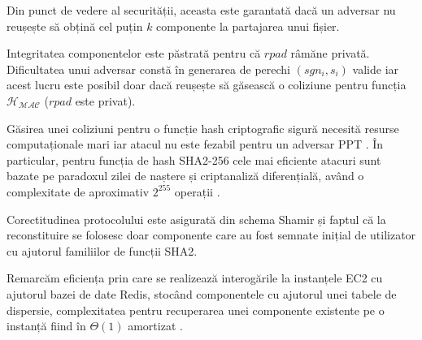 \documentclass[oneside, 12pt]{book}
\begin{document}
Din punct de vedere al securității, aceasta este garantată dacă un adversar nu reușește să obțină cel puțin $k$ componente la partajarea unui fișier.

Integritatea componentelor este păstrată pentru că $rpad$ râmăne privată. Dificultatea unui adversar constă în generarea de perechi $(sgn_i, s_i)$ valide iar acest lucru este posibil doar dacă reușește să găsească o coliziune pentru funcția $\mathcal{H_{MAC}}$ ($rpad$ este privat).

Găsirea unei coliziuni pentru o funcție hash criptografic sigură necesită resurse computaționale mari iar atacul nu este fezabil pentru un adversar PPT \cite{Katz:2007}. În particular, pentru funcția de hash SHA2-256 cele mai eficiente atacuri sunt bazate pe paradoxul zilei de naștere și criptanaliză diferențială, având o complexitate de aproximativ $2^{255}$ operații \cite{khovratovich2012bicliques}.

Corectitudinea protocolului este asigurată din schema Shamir și faptul că la reconstituire se folosesc doar componente care au fost semnate inițial de utilizator cu ajutorul familiilor de funcții SHA2.

Remarcăm eficiența prin care se realizează interogările la instanțele EC2 cu ajutorul bazei de date Redis, stocând componentele cu ajutorul unei tabele de dispersie, complexitatea pentru recuperarea unei componente existente pe o instanță fiind în $\Theta(1)$ amortizat \cite{cormen:2009introduction}.




\end{document}
